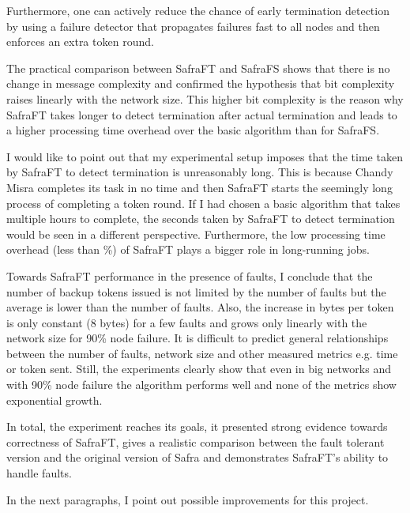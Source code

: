 Furthermore, one can actively reduce the chance of early termination detection by using a failure detector that propagates failures fast to all nodes and then enforces an extra token round.    

The practical comparison between SafraFT and SafraFS shows that there is no change in message complexity and confirmed the hypothesis that bit complexity raises linearly with the network size. 
This higher bit complexity is the reason why SafraFT takes longer to detect termination after actual termination and leads to a higher processing time overhead over the basic algorithm than for SafraFS.

I would like to point out that my experimental setup imposes that the time taken by SafraFT to detect termination is unreasonably long.
This is because Chandy Misra completes its task in no time and then SafraFT starts the seemingly long process of completing a token round.
If I had chosen a basic algorithm that takes multiple hours to complete, the seconds taken by SafraFT to detect termination would be seen in a different perspective.
Furthermore, the low processing time overhead (less than \%) of SafraFT plays a bigger role in long-running jobs.

Towards SafraFT performance in the presence of faults, I conclude that the number of backup tokens issued is not limited by the number of faults but the average is lower than the number of faults.
Also, the increase in bytes per token is only constant (8 bytes) for a few faults and grows only linearly with the network size for 90\% node failure.
It is difficult to predict general relationships between the number of faults, network size and other measured metrics e.g. time or token sent.  
Still, the experiments clearly show that even in big networks and with 90\% node failure the algorithm performs well and none of the metrics show exponential growth.

In total, the experiment reaches its goals, it presented strong evidence towards correctness of SafraFT, gives a realistic comparison between the fault tolerant version and the original version of Safra and demonstrates SafraFT's ability to handle faults.

In the next paragraphs, I point out possible improvements for this project.

